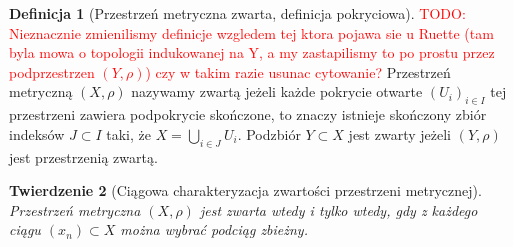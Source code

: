 \documentclass[licencjacka]{pwr_wmat_praca_dyplomowa}
\theoremstyle{plain}
\newtheorem{theorem}{Twierdzenie}
\numberwithin{theorem}{chapter}
\theoremstyle{definition}
\numberwithin{theorem}{chapter}
\newtheorem{definition}[theorem]{Definicja}
\begin{document}
\begin{definition}[Przestrzeń metryczna zwarta, definicja pokryciowa]
\cite[s.~196]{ruette2017chaos}
\textcolor{red}{TODO: Nieznacznie zmienilismy definicje wzgledem tej ktora pojawa sie u Ruette (tam byla mowa o topologii indukowanej na Y, a my zastapilismy to po prostu przez podprzestrzen $(Y, \rho)$) czy w takim razie usunac cytowanie?}
Przestrzeń metryczną $(X, \rho)$ nazywamy zwartą jeżeli każde pokrycie otwarte $(U_i)_{i \in I}$ tej przestrzeni zawiera podpokrycie skończone, to znaczy istnieje skończony zbiór indeksów $J \subset I$ taki, że $X = \bigcup_{i \in J}U_i$.
Podzbiór $Y \subset X$ jest zwarty jeżeli $(Y, \rho)$ jest przestrzenią zwartą.
\end{definition}

\begin{theorem}[Ciągowa charakteryzacja zwartości przestrzeni metrycznej]
\label{rownowaznosc_definicji_pokryciowej_i_ciagowej}
Przestrzeń metryczna $(X, \rho)$ jest zwarta wtedy i tylko wtedy, gdy z każdego ciągu $(x_n) \subset X$ można wybrać podciąg zbieżny.
\end{theorem}
\end{document}
